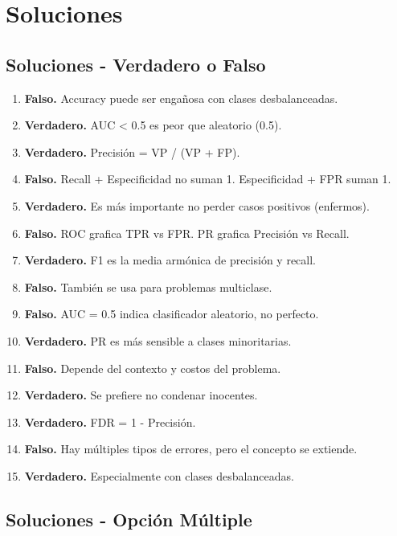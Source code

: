 \documentclass[12pt]{article}
\begin{document}
\newpage

\section{Soluciones}

\subsection{Soluciones - Verdadero o Falso}

\begin{enumerate}
    \item \textbf{Falso.} Accuracy puede ser engañosa con clases desbalanceadas.
    \item \textbf{Verdadero.} AUC < 0.5 es peor que aleatorio (0.5).
    \item \textbf{Verdadero.} Precisión = VP / (VP + FP).
    \item \textbf{Falso.} Recall + Especificidad no suman 1. Especificidad + FPR suman 1.
    \item \textbf{Verdadero.} Es más importante no perder casos positivos (enfermos).
    \item \textbf{Falso.} ROC grafica TPR vs FPR. PR grafica Precisión vs Recall.
    \item \textbf{Verdadero.} F1 es la media armónica de precisión y recall.
    \item \textbf{Falso.} También se usa para problemas multiclase.
    \item \textbf{Falso.} AUC = 0.5 indica clasificador aleatorio, no perfecto.
    \item \textbf{Verdadero.} PR es más sensible a clases minoritarias.
    \item \textbf{Falso.} Depende del contexto y costos del problema.
    \item \textbf{Verdadero.} Se prefiere no condenar inocentes.
    \item \textbf{Verdadero.} FDR = 1 - Precisión.
    \item \textbf{Falso.} Hay múltiples tipos de errores, pero el concepto se extiende.
    \item \textbf{Verdadero.} Especialmente con clases desbalanceadas.
\end{enumerate}

\subsection{Soluciones - Opción Múltiple}
\end{document}
